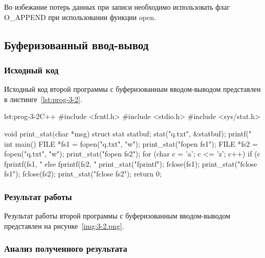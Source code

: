 Во избежание потерь данных при записи необходимо использовать флаг 
O\_APPEND при использовании функции open.

\subsection{Буферизованный ввод-вывод}
\subsubsection{Исходный код}
Исходный код второй программы с буферизованным вводом-выводом 
представлен в листинге~\ref{lst:prog-3-2}.

\begin{listing}{lst:prog-3-2}{C++}
#include <fcntl.h>
#include <stdio.h>
#include <sys/stat.h>

void print_stat(char *msg) 
{
    struct stat statbuf;
    stat("q.txt", &statbuf);
    printf("%
}
int main() 
{
    FILE *fs1 = fopen("q.txt", "w");
    print_stat("fopen fs1");
    FILE *fs2 = fopen("q.txt", "w");
    print_stat("fopen fs2");
    for (char c = 'a'; c <= 'z'; c++) 
    {
        if (c %
            fprintf(fs1, "%
        else
            fprintf(fs2, "%
        print_stat("fprintf");
    }
    fclose(fs1);
    print_stat("fclose fs1");
    fclose(fs2);
    print_stat("fclose fs2");
    return 0;
}
\end{listing}

\subsubsection{Результат работы}
Результат работы второй программы с буферизованным вводом-выводом 
представлен на рисунке~\ref{img:3-2.png}.

\subsubsection{Анализ полученного результата}

